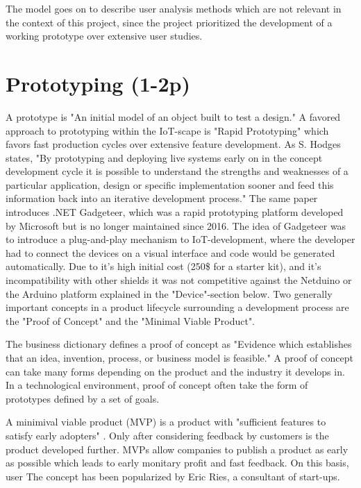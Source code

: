 The model goes on to describe user analysis methods which are not relevant in the context of this project, 
since the project prioritized the development of a working prototype over extensive user studies. 

\section{Prototyping (1-2p)}
A prototype is "An initial model of an object built to test a design." \parencite{prototypeDef}
A favored approach to prototyping within the IoT-scape is "Rapid Prototyping" 
which favors fast production cycles over extensive feature development. 
As S. Hodges states, "By prototyping and deploying live systems early on in the concept development cycle it is possible to understand the strengths and weaknesses of a particular application, design or specific implementation sooner 
and feed this information back into an iterative development process." \parencite{rapidProto3}
The same paper introduces .NET Gadgeteer, which was a rapid prototyping platform developed by Microsoft but is no longer maintained since 2016.
The idea of Gadgeteer was to introduce a plug-and-play mechanism to IoT-development, where the developer had to connect the devices on a visual interface and code would be generated automatically.
Due to it's high initial cost (250\$ for a starter kit), 
and it's incompatibility with other shields it was not competitive against the Netduino or the Arduino platform explained in the "Device"-section below.
Two generally important concepts in a product lifecycle surrounding a development process 
are the "Proof of Concept" and the "Minimal Viable Product".

The business dictionary defines a proof of concept as "Evidence which establishes that an idea, invention, process, or business model is feasible."
\parencite{PoC}
A proof of concept can take many forms depending on the product and the industry it develops in. 
In a technological environment, proof of concept often take the form of prototypes defined by a set of goals.

A minimival viable product (MVP) is a product with "sufficient features to satisfy early adopters" \parencite{mvp}. 
Only after considering feedback by customers is the product developed further. 
MVPs allow companies to publish a product as early as possible which leads to early monitary profit and fast feedback. 
On this basis, user
The concept has been popularized by Eric Ries, a consultant of start-ups.

